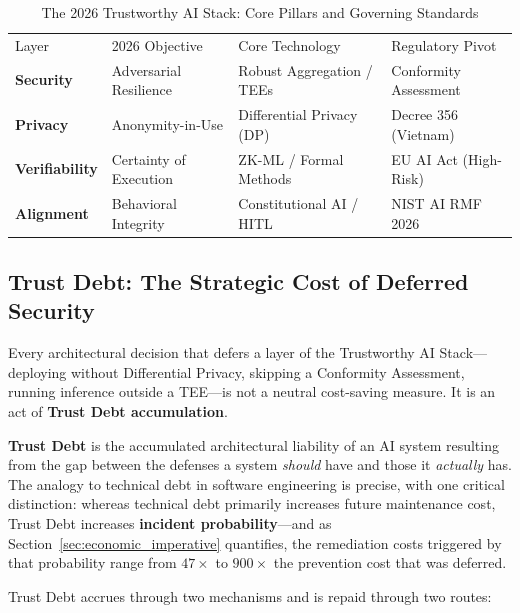\begin{table}[h]
\caption{The 2026 Trustworthy AI Stack: Core Pillars and Governing Standards}
\label{tab:trust_stack_2026}
\centering
\begin{tabular}{p{2.5cm}p{3cm}p{3cm}p{3cm}}
\hline\noalign{\smallskip}
Layer & 2026 Objective & Core Technology & Regulatory Pivot \\
\noalign{\smallskip}\svhline\noalign{\smallskip}
\textbf{Security} & Adversarial Resilience & Robust Aggregation / TEEs & Conformity Assessment \\
\textbf{Privacy} & Anonymity-in-Use & Differential Privacy (DP) & Decree 356 (Vietnam) \\
\textbf{Verifiability} & Certainty of Execution & ZK-ML / Formal Methods & EU AI Act (High-Risk) \\
\textbf{Alignment} & Behavioral Integrity & Constitutional AI / HITL & NIST AI RMF 2026 \\
\end{tabular}
\end{table}

\subsection{Trust Debt: The Strategic Cost of Deferred Security}
\label{subsec:trust_debt_intro}

Every architectural decision that defers a layer of the Trustworthy AI Stack---deploying without Differential Privacy, skipping a Conformity Assessment, running inference outside a TEE---is not a neutral cost-saving measure. It is an act of \textbf{Trust Debt accumulation}.

\textbf{Trust Debt} is the accumulated architectural liability of an AI system resulting from the gap between the defenses a system \emph{should} have and those it \emph{actually} has. The analogy to technical debt in software engineering is precise, with one critical distinction: whereas technical debt primarily increases future maintenance cost, Trust Debt increases \textbf{incident probability}---and as Section~\ref{sec:economic_imperative} quantifies, the remediation costs triggered by that probability range from $47\times$ to $900\times$ the prevention cost that was deferred.

Trust Debt accrues through two mechanisms and is repaid through two routes:


